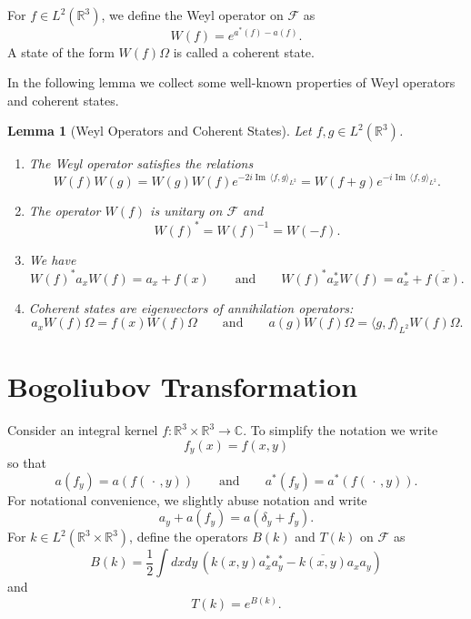 \documentclass[11pt,a4paper,draft,DIV11]{scrartcl}	%
\newtheorem{lem}[thm]{Lemma}
\newcommand{\R}{\mathds{R}}
\newcommand{\N}{\mathcal{N}}
\newcommand{\Rbb}{\mathbb{R}}		%
\newcommand{\Cbb}{\mathbb{C}}		%
\renewcommand{\Im}{\operatorname{Im}\,} 	%
\newcommand{\be}[1]{\begin{equation}\label{eq:#1}}	%
\newcommand{\ee}{\end{equation}}
\begin{document}
For $f \in L^2(\R^3)$, we define the Weyl operator on $\mathcal{F}$ as
\[
  W(f) = e^{a^*(f) - a(f)}.
\]
A state of the form $W(f)\Omega$ is called a coherent state.


In the following lemma we collect some well-known properties of Weyl operators
and coherent states.


\begin{lem}[Weyl Operators and Coherent States] \label{l:W}
  Let $f, g \in L^2(\R^3)$.
  \begin{enumerate}
    \item \label{l:W1} The Weyl operator satisfies the relations
      \[
        W(f) W(g) = W(g) W(f) e^{-2i \Im \langle f, g \rangle_{L^2}} = W(f+g)
        e^{-i \Im \langle f, g \rangle_{L^2}}.
      \]
    \item \label{l:W2} The operator $W(f)$ is unitary on $\mathcal{F}$ and
      \[
        W(f)^* = W(f)^{-1} = W(-f).
      \]
    \item \label{l:W3} We have
      \[
        W(f)^* a_x W(f) = a_x + f(x) \qquad \text{and} \qquad W(f)^* a_x^*
        W(f) = a_x^* + \overline{f(x)}.
      \]
    \item \label{l:W4} Coherent states are
      eigenvectors of annihilation operators:
      \[
        a_x W(f)\Omega = f(x) W(f)\Omega \qquad \text{and} \qquad a(g) W(f)\Omega
        = \langle g, f \rangle_{L^2} W(f)\Omega.
      \]
\iffalse    \item \label{l:W5} The expectation of the number of particles in the
      coherent state $\psi(f)$ is given by $\| f \|_{L^2}^2$, that is,
      \[
        \langle \psi(f), \N^2 \psi(f) \rangle = \| f \|_{L^2}^2.
      \]
      Also the variance of the number of particles in $\psi(f)$ is given by
      $\| f \|_{L^2}$ (the distribution of $\N$ is poisson), that is,
      \[
        \langle \psi(f), \N^2 \psi(f) \rangle - \langle \psi(f), \N \psi(f)
        \rangle^2 = \| f \|_{L^2}^2.
      \]
    \item \label{l:W6} Coherent states are normalized but not orthogonal to
      each other. In fact,
      \[
        \langle \psi(f), \psi(g) \rangle = e^{-\frac{1}{2} (\| f \|_{L^2}^2 +
        \| g \|_{L^2}^2 - 2 \langle f, g \rangle_{L^2} )} \qquad \text{so
        that} \qquad |\langle \psi(f), \psi(g) \rangle| = e^{-\frac{1}{2} \| f
        - g \|_{L^2}^2}.
      \]\fi
  \end{enumerate}
\end{lem}


\section{Bogoliubov Transformation}
\label{s:bogoliubov}
Consider an integral kernel $f\colon \Rbb^3\times\Rbb^3 \to \Cbb$. To simplify the
notation we write
\be{no1}
  f_y(x) = f(x,y)
\ee
so that
\[
  a(f_y) = a(f(\,\cdot\,,y)) \qquad \text{and} \qquad a^*(f_y) =
  a^*(f(\,\cdot\,,y)).
\]
For notational convenience, we slightly abuse notation and write
\[
  a_y + a(f_y) = a(\delta_y + f_y).
\]
%
For $k \in L^2(\R^3 \times \R^3)$, define the operators $B(k)$ and $T(k)$ on
$\mathcal{F}$ as
\[
  B(k) = \frac{1}{2} \int dxdy \, (k(x,y) a_x^* a_y^* - \overline{k(x,y)} a_x
  a_y)
\]
and
\[
  T(k) = e^{B(k)}.
\]
\end{document}
